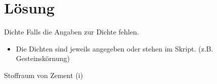\section{Lösung}
\BlueSectionSlide

\begin{frame}{Dichte}
    Falls die Angaben zur Dichte fehlen.
    \begin{itemize}
        \item Die Dichten sind jeweils angegeben oder stehen im Skript. (z.B. Gesteinskörnung)
    \end{itemize}
\end{frame}

\begin{frame}{Stoffraum von Zement (i)}
    \begin{table}[h]
        \centering
        \caption{Aufgabe zur Stoffraumberechnung}
        \small
    \label{tab:Stoffraumberechnung}
        \end{table}

\end{frame}

